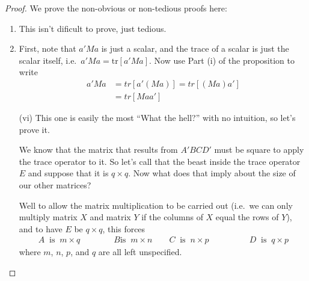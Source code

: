 \documentclass[12pt]{article}
\theoremstyle{plain}
\theoremstyle{definition}
\theoremstyle{remark}
\begin{document}
\begin{proof}
We prove the non-obvious or non-tedious proofs here:
\begin{enumerate}[label=(\roman*)]
  \item This isn't dificult to prove, just tedious.
  \item First, note that $a'Ma$ is just a scalar,  and the trace of a
    scalar is just the scalar itself, i.e.\ $a'Ma=\text{tr}[a'Ma]$. Now
    use Part (i) of the proposition to write
    \begin{align*}
        a' M a &= tr\left[a' (M a) \right]
      = tr\left[(M a) a' \right]  \\
      &= tr\left[M a a' \right]
    \end{align*}

  \item[(vi)] This one is easily the most ``What the hell?'' with no
    intuition, so let's prove it.

    We know that the matrix that results from $A'BCD'$ must be square to
    apply the trace operator to it.  So let's call that the beast inside
    the trace operator $E$ and suppose that it is $q \times q$. Now what
    does that imply about the size of our other matrices?

    Well to allow the matrix multiplication to be carried out (i.e.\ we
    can only multiply matrix $X$ and matrix $Y$ if the columns of $X$
    equal the rows of $Y$), and to have $E$ be $q\times q$, this forces
    \begin{align*}
        A\;\;  \text{is}\;\;  m \times q \qquad
      \qquad B \text{is} \;\; m \times n \qquad
        C\;\;  \text{is}\;\; n \times p \qquad
      & \qquad
        D\;\;  \text{is}\;\;  q \times p
    \end{align*}
    where $m$, $n$, $p$, and $q$ are all left unspecified.


\end{enumerate}
\end{proof}
\end{document}
